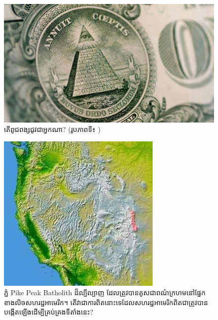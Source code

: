 \documentclass[10pt,twocolumn,letterpaper]{article}
\begin{document}
\begin{figure}[t]
\begin{center}
   \includegraphics[width=1\linewidth]{illuminati.jpg}
\end{center}
   \caption{តើពូជពង្សជូវជាអ្នកណា? (រូបភាពទី៖ \cite{35})}
\label{fig:10}
\label{fig:onecol}
\end{figure}

\begin{figure}[t]
\begin{center}
   \includegraphics[width=1\linewidth]{pike.jpg}
\end{center}
   \caption{ភ្នំ Pike Peak Batholith ដ៏ល្បីល្បាញ ដែលត្រូវបានគូសជាពណ៌ក្រហមនៅផ្នែកខាងលិចសហរដ្ឋអាមេរិក\cite{36}។ តើវាជាការពិតនោះទេដែលសហរដ្ឋអាមេរិកពិតជាត្រូវបានបង្កើតឡើងដើម្បីគ្រប់គ្រងទីតាំងនេះ?}
\label{fig:12}
\label{fig:onecol}
\end{figure}
\end{document}
